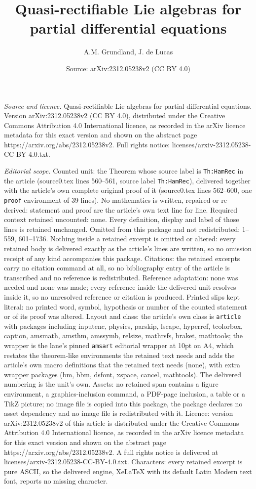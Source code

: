 \documentclass[10pt,a4paper]{amsart}
\title[Quasi-rectifiable Lie algebras for partial differential equa]{Quasi-rectifiable Lie algebras for partial differential equations}
\author{A.M. Grundland, J. de Lucas}
\date{Source: arXiv:2312.05238v2 (CC BY 4.0)}
\begin{document}
\maketitle

\noindent\emph{Source and licence.} Quasi-rectifiable Lie algebras for partial differential equations. Version arXiv:2312.05238v2 (CC BY 4.0), distributed under the Creative Commons Attribution 4.0 International licence, as recorded in the arXiv licence metadata for this exact version and shown on the abstract page https://arxiv.org/abs/2312.05238v2. Full rights notice: licenses/arxiv-2312.05238-CC-BY-4.0.txt.\par\smallskip

\noindent\textit{Editorial scope.} Counted unit: the Theorem whose source label is \texttt{Th:HamRec} in the article (source0.tex lines 560--561, source label \texttt{Th:HamRec}), delivered together with the article's own complete original proof of it (source0.tex lines 562--600, one \texttt{proof} environment of 39 lines). No mathematics is written, repaired or re-derived: statement and proof are the article's own text line for line. Required context retained uncounted: none. Every definition, display and label of those lines is retained unchanged. Omitted from this package and not redistributed: 1--559, 601--1736. Nothing inside a retained excerpt is omitted or altered: every retained body is delivered exactly as the article's lines are written, so no omission receipt of any kind accompanies this package. Citations: the retained excerpts carry no citation command at all, so no bibliography entry of the article is transcribed and no reference is redistributed. Reference adaptation: none was needed and none was made; every reference inside the delivered unit resolves inside it, so no unresolved reference or citation is produced. Printed slips kept literal: no printed word, symbol, hypothesis or number of the counted statement or of its proof was altered. Layout and class: the article's own class is \texttt{article} with packages including inputenc, physics, parskip, lscape, hyperref, tcolorbox, caption, amsmath, amsthm, amssymb, relsize, mathrsfs, braket, mathtools; the wrapper is the lane's pinned \texttt{amsart} editorial wrapper at 10pt on A4, which restates the theorem-like environments the retained text needs and adds the article's own macro definitions that the retained text needs (none), with extra wrapper packages (bm, bbm, dsfont, xspace, cancel, mathtools). The delivered numbering is the unit's own. Assets: no retained span contains a figure environment, a graphics-inclusion command, a PDF-page inclusion, a table or a TikZ picture; no image file is copied into this package, the package declares no asset dependency and no image file is redistributed with it. Licence: version arXiv:2312.05238v2 of this article is distributed under the Creative Commons Attribution 4.0 International licence, as recorded in the arXiv licence metadata for this exact version and shown on the abstract page https://arxiv.org/abs/2312.05238v2. A full rights notice is delivered at licenses/arxiv-2312.05238-CC-BY-4.0.txt. Characters: every retained excerpt is pure ASCII, so the delivered engine, XeLaTeX with its default Latin Modern text font, reports no missing character.
\end{document}
